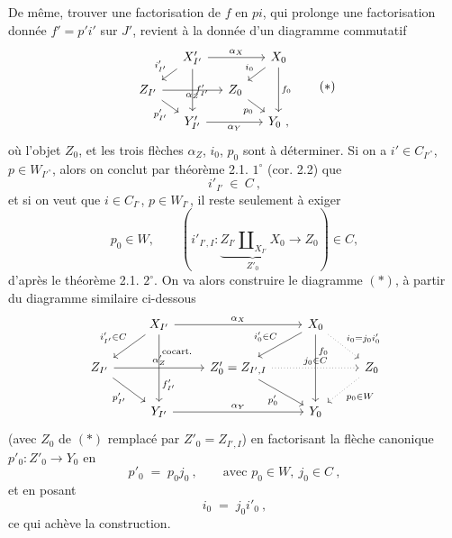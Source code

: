 De même, trouver une factorisation de $f$ en $pi$, qui prolonge une factorisation donnée $f'=p'i'$ sur $J'$, revient à la donnée d'un diagramme commutatif
\[
\begin{tikzcd}[column sep=small, row sep=small]
& X'_{I'} \arrow[rr, "\alpha_X"] \arrow[dl, "i'_{I'}"'] \arrow[dd, "f'_{I'}"] & & X_0 \arrow[dl, "i_0"'] \arrow[dd, "f_0"] \\
Z_{I'} \arrow[rr, "\alpha_Z"'] \arrow[dr, "p'_{I'}"'] & & Z_0 \arrow[dr, "p_0"'] & \\
& Y'_{I'} \arrow[rr, "\alpha_Y"'] & & Y_0\ ,
\end{tikzcd}
\tag*{$(*)$}
\]
où l'objet $Z_0$, et les trois flèches $\alpha_Z$, $i_0$, $p_0$ sont à déterminer. Si on a $i'\in C_{I'^\circ}$, $p\in W_{I'^\circ}$, %
alors on conclut par théorème 2.1. $1^\circ$ (cor. 2.2) que
\[
i'_{I'}\ \in\ C\ ,
\]
et si on veut que $i\in C_{I^\circ}$, $p\in W_{I^\circ}$, il reste seulement à exiger
\[
p_0\in W, \qquad (i'_{I',I}:\underbrace{Z_{I'}\amalg_{X_{I'}}X_0}_{Z'_0}\longrightarrow Z_0)\in C,
\]
d'après le théorème 2.1. $2^\circ$. On va alors construire le diagramme $(*)$, à partir du diagramme similaire ci-dessous
\[
\begin{tikzcd}
& X_{I'} \arrow[rr, "\alpha_X"] \arrow[dl, "i'_{I'}\in C"'] \arrow[dd, "\text{cocart.}" {pos=0.25}, "f'_{I'}" {pos=0.75}] & & X_0 \arrow[dl, "i'_0\in C"'] \arrow[dd, "f_0" {pos=0.25}] \arrow[dr, dotted, "i_0=j_0i'_0"] & \\
Z_{I'} \arrow[rr, "\alpha'_Z"] \arrow[dr, "p'_{I'}"'] & & Z'_0=Z_{I',I} \arrow[rr, dotted, "j_0\in C"] \arrow[dr, "p'_0"'] & & Z_0 \arrow[dl, dotted, "p_0\in W"] \\
& Y_{I'} \arrow[rr, "\alpha_Y"] & & Y_0 &
\end{tikzcd}
\]
(avec $Z_0$ de $(*)$ remplacé par $Z'_0=Z_{I',I}$) en factorisant la flèche canonique $p'_0:Z'_0\longrightarrow Y_0$ en
\[
p'_0 \;=\; p_0j_0\ , \qquad \text{avec } p_0\in W,\ j_0\in C\ ,
\]
et en posant
\[
i_0 \;=\; j_0i'_0\ ,
\]
ce qui achève la construction.

